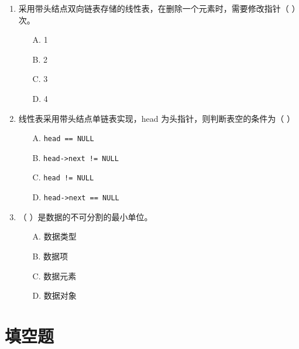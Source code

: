 \documentclass[12pt, a4paper]{article}
\begin{document}
\begin{enumerate}[label=\arabic*.]
	\item 采用带头结点双向链表存储的线性表，在删除一个元素时，需要修改指针（ ）次。
	      \begin{enumerate}
		      \item[A.] 1
		      \item[B.] 2
		      \item[C.] 3
		      \item[D.] 4
	      \end{enumerate}

	\item 线性表采用带头结点单链表实现，head 为头指针，则判断表空的条件为（ ）
	      \begin{enumerate}
		      \item[A.] \texttt{head == NULL}
		      \item[B.] \texttt{head->next != NULL}
		      \item[C.] \texttt{head != NULL}
		      \item[D.] \texttt{head->next == NULL}
	      \end{enumerate}

	\item （ ）是数据的不可分割的最小单位。
	      \begin{enumerate}
		      \item[A.] 数据类型
		      \item[B.] 数据项
		      \item[C.] 数据元素
		      \item[D.] 数据对象
	      \end{enumerate}
\end{enumerate}

\section*{填空题}
\end{document}
